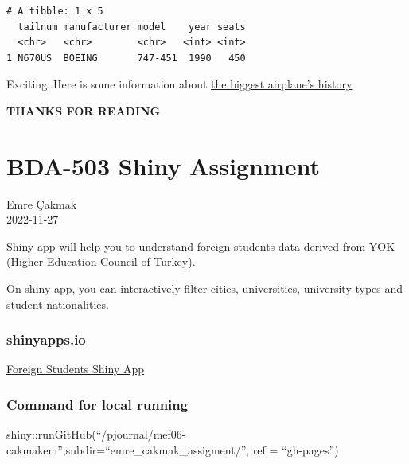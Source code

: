 \documentclass[
  letterpaper,
  DIV=11,
  numbers=noendperiod]{scrreprt}
\begin{document}
\begin{verbatim}
# A tibble: 1 x 5
  tailnum manufacturer model    year seats
  <chr>   <chr>        <chr>   <int> <int>
1 N670US  BOEING       747-451  1990   450
\end{verbatim}

Exciting..Here is some information about
\href{https://www.planespotters.net/airframe/boeing-747-400-n670us-delta-air-lines/3wno03}{the
biggest airplane's history}

\textbf{THANKS FOR READING}


\hypertarget{bda-503-shiny-assignment}{%
\chapter{BDA-503 Shiny Assignment}\label{bda-503-shiny-assignment}}

Emre Çakmak\\
2022-11-27

\hfill\break

Shiny app will help you to understand foreign students data derived from
YOK (Higher Education Council of Turkey).

On shiny app, you can interactively filter cities, universities,
university types and student nationalities.

\hypertarget{shinyapps.io}{%
\subsection{shinyapps.io}\label{shinyapps.io}}

\href{https://emre-cakmak.shinyapps.io/emre_cakmak_assigment/}{Foreign
Students Shiny App}

\hypertarget{command-for-local-running}{%
\subsection{Command for local running}\label{command-for-local-running}}

shiny::runGitHub(``/pjournal/mef06-cakmakem'',subdir=``emre\_cakmak\_assigment/'',
ref = ``gh-pages'')
\end{document}
